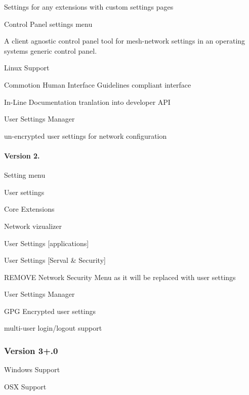 \begin{DoxyItemize}
\begin{DoxyItemize}
\item Settings for any extensions with custom settings pages
\end{DoxyItemize}
\item Control Panel settings menu
\begin{DoxyItemize}
\item A client agnostic control panel tool for mesh-\/network settings in an operating systems generic control panel.
\end{DoxyItemize}
\item Linux Support
\item Commotion Human Interface Guidelines compliant interface
\item In-\/\-Line Documentation tranlation into developer A\-P\-I
\item User Settings Manager
\begin{DoxyItemize}
\item un-\/encrypted user settings for network configuration
\end{DoxyItemize}
\end{DoxyItemize}

\paragraph*{Version 2.}


\begin{DoxyItemize}
\item Setting menu
\item User settings
\item Core Extensions
\begin{DoxyItemize}
\item Network vizualizer
\item User Settings \mbox{[}applications\mbox{]}
\item User Settings \mbox{[}Serval \& Security\mbox{]}
\end{DoxyItemize}
\item R\-E\-M\-O\-V\-E Network Security Menu as it will be replaced with user settings
\item User Settings Manager
\begin{DoxyItemize}
\item G\-P\-G Encrypted user settings
\end{DoxyItemize}
\item multi-\/user login/logout support
\end{DoxyItemize}

\subsubsection*{Version 3+.0}


\begin{DoxyItemize}
\item Windows Support
\item O\-S\-X Support 
\end{DoxyItemize}